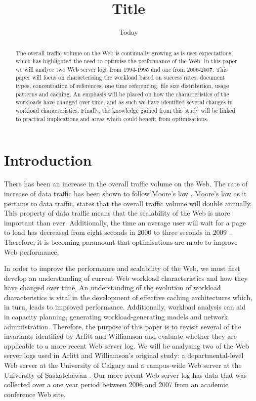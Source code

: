 \documentclass[10pt,conference]{IEEEtran}
\title{Title}
\author{\IEEEauthorblockN{Chelsea Farley, Ryan Lewis, David Armstrong, Rina Gao and Ryunosuke Madenokoji}
\IEEEauthorblockA{The University of Auckland}}
\date{Today}
\begin{document}
\maketitle

\begin{abstract}
The overall traffic volume on the Web is continually growing as is user expectations, which has highlighted the need to optimise the performance of the Web. In this paper we will analyse two Web server logs from 1994-1995 and one from 2006-2007. This paper will focus on characterising the workload based on success rates, document types, concentration of references, one time referencing, file size distribution, usage patterns and caching. An emphasis will be placed on how the characteristics of the workloads have changed over time, and as such we have identified several changes in workload characteristics. Finally, the knowledge gained from this study will be linked to practical implications and areas which could benefit from optimisations.
\end{abstract}

\section{Introduction}
There has been an increase in the overall traffic volume on the Web. The rate of increase of data traffic has been shown to follow Moore's law \cite{williams05}. Moore's law as it pertains to data traffic, states that the overall traffic volume will double annually. This property of data traffic means that the scalability of the Web is more important than ever. Additionally, the time an average user will wait for a page to load has decreased from eight seconds in 2000 to three seconds in 2009 \cite{Butkiewicz}. Therefore, it is becoming paramount that optimisations are made to improve Web performance.

In order to improve the performance and scalability of the Web, we must first develop an understanding of current Web workload characteristics and how they have changed over time. An understanding of the evolution of workload characteristics is vital in the development of effective caching architectures which, in turn, leads to improved performance. Additionally, workload analysis can aid in capacity planning, generating workload-generating models and network administration. Therefore, the purpose of this paper is to revisit several of the invariants identified by Arlitt and Williamson \cite{keynote} and evaluate whether they are applicable to a more recent Web server log. We will be analysing two of the Web server logs used in Arlitt and Williamson's original study: a departmental-level Web server at the University of Calgary and a campus-wide Web server at the University of Saskatchewan \cite{keynote}. Our more recent Web server log has data that was collected over a one year period between 2006 and 2007 from an academic conference Web site.
\end{document}
